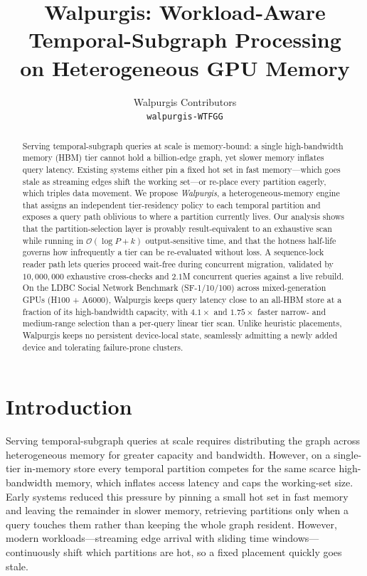 \documentclass{article}
\title{Walpurgis: Workload-Aware Temporal-Subgraph Processing\\on Heterogeneous GPU Memory}
\author{
Walpurgis Contributors\\
\texttt{walpurgis-WTFGG}
}
\date{}
\begin{document}
\maketitle

\begin{abstract}
Serving temporal-subgraph queries at scale is memory-bound: a single high-bandwidth
memory (HBM) tier cannot hold a billion-edge graph, yet slower memory inflates query
latency. Existing systems either pin a fixed hot set in fast memory---which goes stale
as streaming edges shift the working set---or re-place every partition eagerly, which
triples data movement. We propose \emph{Walpurgis}, a heterogeneous-memory engine that
assigns an independent tier-residency policy to each temporal partition and exposes a
query path oblivious to where a partition currently lives. Our analysis shows that the
partition-selection layer is provably result-equivalent to an exhaustive scan while
running in $\mathcal{O}(\log P + k)$ output-sensitive time, and that the hotness
half-life governs how infrequently a tier can be re-evaluated without loss. A
sequence-lock reader path lets queries proceed wait-free during concurrent migration,
validated by $10{,}000{,}000$ exhaustive cross-checks and $2.1$M concurrent queries
against a live rebuild. On the LDBC Social Network Benchmark (SF-1/10/100) across
mixed-generation GPUs (H100 + A6000), Walpurgis keeps query latency close to an all-HBM
store at a fraction of its high-bandwidth capacity, with $4.1\times$ and $1.75\times$
faster narrow- and medium-range selection than a per-query linear tier scan. Unlike
heuristic placements, Walpurgis keeps no persistent device-local state, seamlessly
admitting a newly added device and tolerating failure-prone clusters.
\end{abstract}

\section{Introduction}
\label{sec:introduction}

Serving temporal-subgraph queries at scale requires distributing the graph across
heterogeneous memory for greater capacity and bandwidth. However, on a single-tier
in-memory store every temporal partition competes for the same scarce high-bandwidth
memory, which inflates access latency and caps the working-set size. Early systems
reduced this pressure by pinning a small hot set in fast memory and leaving the
remainder in slower memory, retrieving partitions only when a query touches them rather
than keeping the whole graph resident. However, modern workloads---streaming edge
arrival with sliding time windows---continuously shift which partitions are hot, so a
fixed placement quickly goes stale.
\end{document}
